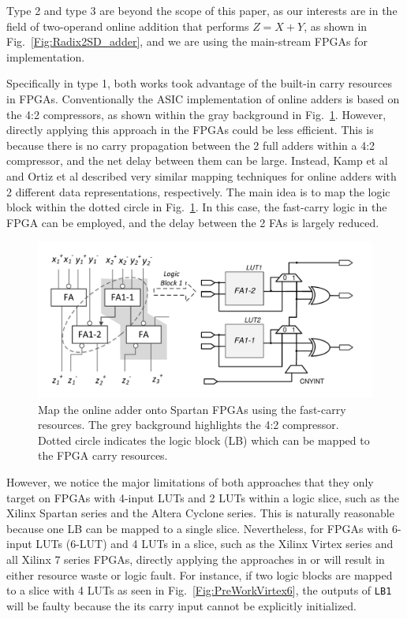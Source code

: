 \documentclass[conference]{IEEEtran}
\begin{document}
Type 2 and type 3 are beyond the scope of this paper, as our interests are in the field of two-operand online addition that performs $Z=X+Y$, as shown in Fig.~\ref{Fig:Radix2SD_adder}, and we are using the main-stream FPGAs for implementation.

Specifically in type 1, both works took advantage of the built-in carry resources in FPGAs. Conventionally the ASIC implementation of online adders is based on the 4:2 compressors, as shown within the gray background in Fig.~\ref{Fig:PreviousWork}. However, directly applying this approach in the FPGAs could be less efficient. This is because there is no carry propagation between the 2 full adders within a 4:2 compressor, and the net delay between them can be large. Instead, Kamp et al and Ortiz et al described very similar mapping techniques for online adders with 2 different data representations, respectively. The main idea is to map the logic block within the dotted circle in Fig.~\ref{Fig:PreviousWork}. In this case, the fast-carry logic in the FPGA can be employed, and the delay between the 2 FAs is largely reduced.

\begin{figure}[tbp]
	\centering
	\includegraphics[width=.5\textwidth]{./Figures/SDAdder_42comp_Spartan.pdf}
	\caption{Map the online adder onto Spartan FPGAs using the fast-carry resources. The grey background highlights the 4:2 compressor. Dotted circle indicates the logic block (LB) which can be mapped to the FPGA carry resources.}
	\label{Fig:PreviousWork}
\end{figure}

However, we notice the major limitations of both approaches that they only target on FPGAs with 4-input LUTs and 2 LUTs within a logic slice, such as the Xilinx Spartan series and the Altera Cyclone series. This is naturally reasonable because one LB can be mapped to a single slice. Nevertheless, for FPGAs with 6-input LUTs (6-LUT) and 4 LUTs in a slice, such as the Xilinx Virtex series and all Xilinx 7 series FPGAs, directly applying the approaches in \cite{FPT09RA} or \cite{ASAP09RA} will result in either resource waste or logic fault. For instance, if two logic blocks are mapped to a slice with 4 LUTs as seen in Fig.~\ref{Fig:PreWorkVirtex6}, the outputs of \texttt{LB1} will be faulty because the its carry input cannot be explicitly initialized.
\end{document}
